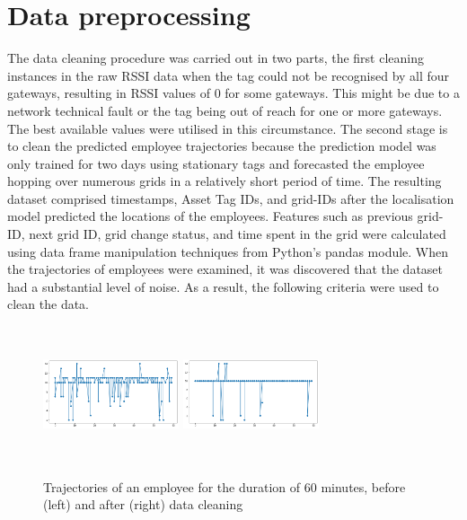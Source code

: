 \documentclass[acmtog]{acmart}
\begin{document}
\section{Data preprocessing}
The data cleaning procedure was carried out in two parts, the first cleaning instances in the raw RSSI data when the tag could not be recognised by all four gateways, resulting in RSSI values of 0 for some gateways. This might be due to a network technical fault or the tag being out of reach for one or more gateways. The best available values were utilised in this circumstance. The second stage is to clean the predicted employee trajectories because the prediction model was only trained for two days using stationary tags and forecasted the employee hopping over numerous grids in a relatively short period of time.  
The resulting dataset comprised timestamps, Asset Tag IDs, and grid-IDs after the localisation model predicted the locations of the employees. Features such as previous grid-ID, next grid ID, grid change status, and time spent in the grid were calculated using data frame manipulation techniques from Python's pandas module. When the trajectories of employees were examined, it was discovered that the dataset had a substantial level of noise. As a result, the following criteria were used to clean the data.
\begin{figure}[h]
  \centering
  \includegraphics[width=4cm,height=4cm,keepaspectratio]{5a_Trajectory_feb22_14and15_before_cleaning.png}
  \includegraphics[width=4cm,height=4cm,keepaspectratio]{5a_Trajectory_feb22_14and15_after_cleaning.png}
  \caption{Trajectories of an employee for the duration of 60 minutes, before (left) and after (right) data cleaning}
  \label{Data cleaning}
  \end{figure}
\end{document}
